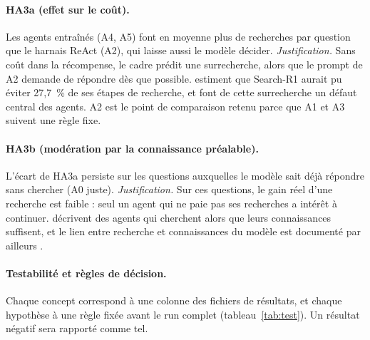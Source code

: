 \documentclass[11pt,a4paper]{article}
\begin{document}
\paragraph{HA3a (effet sur le coût).} Les agents entraînés (A4, A5) font en moyenne plus de recherches par question que le harnais ReAct (A2), qui laisse aussi le modèle décider.
\emph{Justification.} Sans coût dans la récompense, le cadre prédit une surrecherche, alors que le prompt de A2 demande de répondre dès que possible. \citet{wu2025search} estiment que Search-R1 aurait pu éviter 27,7~\% de ses étapes de recherche, et \citet{tang2026saas} font de cette surrecherche un défaut central des agents. A2 est le point de comparaison retenu parce que A1 et A3 suivent une règle fixe.

\paragraph{HA3b (modération par la connaissance préalable).} L'écart de HA3a persiste sur les questions auxquelles le modèle sait déjà répondre sans chercher (A0 juste).
\emph{Justification.} Sur ces questions, le gain réel d'une recherche est faible : seul un agent qui ne paie pas ses recherches a intérêt à continuer. \citet{tang2026saas} décrivent des agents qui cherchent alors que leurs connaissances suffisent, et le lien entre recherche et connaissances du modèle est documenté par ailleurs \citep{mallen2022when,yin2023do}.

\paragraph{Testabilité et règles de décision.} Chaque concept correspond à une colonne des fichiers de résultats, et chaque hypothèse à une règle fixée avant le run complet (tableau~\ref{tab:test}). Un résultat négatif sera rapporté comme tel.
\end{document}
